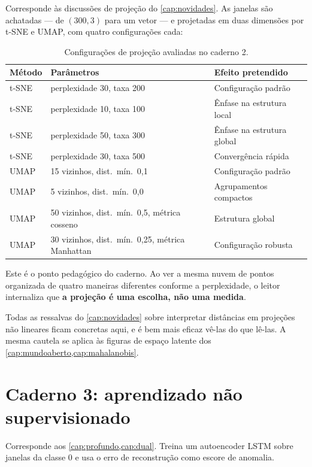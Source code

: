 Corresponde às discussões de projeção do \cref{cap:novidades}. As janelas são achatadas
--- de $(300, 3)$ para um vetor --- e projetadas em duas dimensões por t-SNE e UMAP, com
quatro configurações cada:

\begin{table}[htbp]
\centering
\caption{Configurações de projeção avaliadas no caderno 2.}
\label{tab:pratica-projecao}
\small
\begin{tabular}{llp{5.2cm}}
\toprule
\textbf{Método} & \textbf{Parâmetros} & \textbf{Efeito pretendido} \\
\midrule
t-SNE & perplexidade 30, taxa 200 & Configuração padrão \\
t-SNE & perplexidade 10, taxa 100 & Ênfase na estrutura local \\
t-SNE & perplexidade 50, taxa 300 & Ênfase na estrutura global \\
t-SNE & perplexidade 30, taxa 500 & Convergência rápida \\
\addlinespace
UMAP & 15 vizinhos, dist.\ mín.\ 0,1 & Configuração padrão \\
UMAP & 5 vizinhos, dist.\ mín.\ 0,0 & Agrupamentos compactos \\
UMAP & 50 vizinhos, dist.\ mín.\ 0,5, métrica cosseno & Estrutura global \\
UMAP & 30 vizinhos, dist.\ mín.\ 0,25, métrica Manhattan & Configuração robusta \\
\bottomrule
\end{tabular}
\end{table}

\begin{destaque}
Este é o ponto pedagógico do caderno. Ao ver a mesma nuvem de pontos organizada de quatro
maneiras diferentes conforme a perplexidade, o leitor internaliza que
\textbf{a projeção é uma escolha, não uma medida}.

Todas as ressalvas do \cref{cap:novidades} sobre interpretar distâncias em projeções não
lineares ficam concretas aqui, e é bem mais eficaz vê-las do que lê-las. A mesma cautela
se aplica às figuras de espaço latente dos \cref{cap:mundoaberto,cap:mahalanobis}.
\end{destaque}

\section{Caderno 3: aprendizado não supervisionado}

Corresponde aos \cref{cap:profundo,cap:dual}. Treina um autoencoder LSTM sobre janelas da
classe 0 e usa o erro de reconstrução como escore de anomalia.

